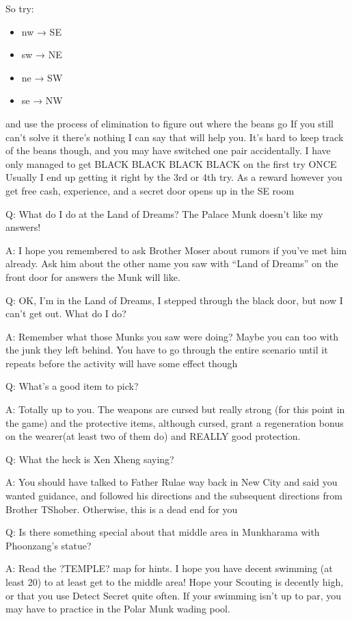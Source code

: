 \documentclass[12pt]{article}
\providecommand{\tightlist}{%
  \setlength{\itemsep}{0pt}\setlength{\parskip}{0pt}}
\begin{document}
So try:

\begin{itemize}
\tightlist
\item
  nw → SE
\item
  sw → NE
\item
  ne → SW
\item
  se → NW
\end{itemize}

and use the process of elimination to figure out where the beans go If
you still can't solve it there's nothing I can say that will help you.
It's hard to keep track of the beans though, and you may have switched
one pair accidentally. I have only managed to get BLACK BLACK BLACK
BLACK on the first try ONCE Usually I end up getting it right by the 3rd
or 4th try. As a reward however you get free cash, experience, and a
secret door opens up in the SE room

Q: What do I do at the Land of Dreams? The Palace Munk doesn't like my
answers!

A: I hope you remembered to ask Brother Moser about rumors if you've met
him already. Ask him about the other name you saw with ``Land of
Dreams'' on the front door for answers the Munk will like.

Q: OK, I'm in the Land of Dreams, I stepped through the black door, but
now I can't get out. What do I do?

A: Remember what those Munks you saw were doing? Maybe you can too with
the junk they left behind. You have to go through the entire scenario
until it repeats before the activity will have some effect though

Q: What's a good item to pick?

A: Totally up to you. The weapons are cursed but really strong (for this
point in the game) and the protective items, although cursed, grant a
regeneration bonus on the wearer(at least two of them do) and REALLY
good protection.

Q: What the heck is Xen Xheng saying?

A: You should have talked to Father Rulae way back in New City and said
you wanted guidance, and followed his directions and the subsequent
directions from Brother TShober. Otherwise, this is a dead end for you

Q: Is there something special about that middle area in Munkharama with
Phoonzang's statue?

A: Read the ?TEMPLE? map for hints. I hope you have decent swimming (at
least 20) to at least get to the middle area! Hope your Scouting is
decently high, or that you use Detect Secret quite often. If your
swimming isn't up to par, you may have to practice in the Polar Munk
wading pool.
\end{document}
